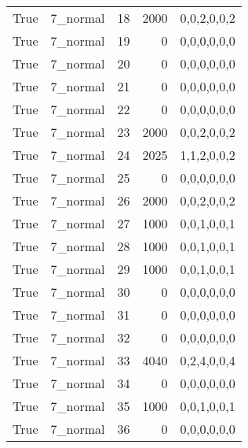 \begin{tabular}{llrrl}
 True            & 7\_normal            &            18 &                  2000 & 0,0,2,0,0,2   \\
 True            & 7\_normal            &            19 &                     0 & 0,0,0,0,0,0   \\
 True            & 7\_normal            &            20 &                     0 & 0,0,0,0,0,0   \\
 True            & 7\_normal            &            21 &                     0 & 0,0,0,0,0,0   \\
 True            & 7\_normal            &            22 &                     0 & 0,0,0,0,0,0   \\
 True            & 7\_normal            &            23 &                  2000 & 0,0,2,0,0,2   \\
 True            & 7\_normal            &            24 &                  2025 & 1,1,2,0,0,2   \\
 True            & 7\_normal            &            25 &                     0 & 0,0,0,0,0,0   \\
 True            & 7\_normal            &            26 &                  2000 & 0,0,2,0,0,2   \\
 True            & 7\_normal            &            27 &                  1000 & 0,0,1,0,0,1   \\
 True            & 7\_normal            &            28 &                  1000 & 0,0,1,0,0,1   \\
 True            & 7\_normal            &            29 &                  1000 & 0,0,1,0,0,1   \\
 True            & 7\_normal            &            30 &                     0 & 0,0,0,0,0,0   \\
 True            & 7\_normal            &            31 &                     0 & 0,0,0,0,0,0   \\
 True            & 7\_normal            &            32 &                     0 & 0,0,0,0,0,0   \\
 True            & 7\_normal            &            33 &                  4040 & 0,2,4,0,0,4   \\
 True            & 7\_normal            &            34 &                     0 & 0,0,0,0,0,0   \\
 True            & 7\_normal            &            35 &                  1000 & 0,0,1,0,0,1   \\
 True            & 7\_normal            &            36 &                     0 & 0,0,0,0,0,0   \\

\end{tabular}
